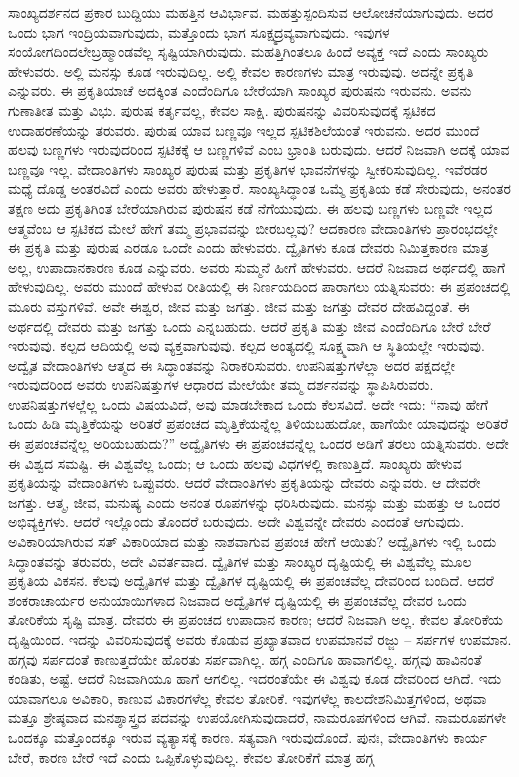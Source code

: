 ಸಾಂಖ್ಯದರ್ಶನದ ಪ್ರಕಾರ ಬುದ್ದಿಯು ಮಹತ್ತಿನ ಆವಿರ್ಭಾವ. ಮಹತ್ತು\break ಸ್ಪಂದಿಸುವ ಆಲೋಚನೆಯಾಗುವುದು. ಅದರ ಒಂದು ಭಾಗ ಇಂದ್ರಿಯವಾಗುವುದು, ಮತ್ತೊಂದು ಭಾಗ ಸೂಕ್ಷ್ಮದ್ರವ್ಯವಾಗುವುದು. ಇವುಗಳ ಸಂಯೋಗದಿಂದಲೇ\break ಬ್ರಹ್ಮಾಂಡವೆಲ್ಲ ಸೃಷ್ಟಿಯಾಗಿರುವುದು. ಮಹತ್ತಿಗಿಂತಲೂ ಹಿಂದೆ ಅವ್ಯಕ್ತ ಇದೆ ಎಂದು ಸಾಂಖ್ಯರು ಹೇಳುವರು. ಅಲ್ಲಿ ಮನಸ್ಸು ಕೂಡ ಇರುವುದಿಲ್ಲ. ಅಲ್ಲಿ ಕೇವಲ ಕಾರಣಗಳು ಮಾತ್ರ ಇರುವುವು. ಅದನ್ನೇ ಪ್ರಕೃತಿ ಎನ್ನುವರು. ಈ ಪ್ರಕೃತಿಯಾಚೆ ಅದಕ್ಕಿಂತ ಎಂದೆಂದಿಗೂ ಬೇರೆಯಾಗಿ ಸಾಂಖ್ಯರ ಪುರುಷನು ಇರುವನು. ಅವನು ಗುಣಾತೀತ ಮತ್ತು ವಿಭು. ಪುರುಷ ಕರ್ತೃವಲ್ಲ, ಕೇವಲ ಸಾಕ್ಷಿ. ಪುರುಷನನ್ನು ವಿವರಿಸುವುದಕ್ಕೆ ಸ್ಪಟಿಕದ ಉದಾಹರಣೆಯನ್ನು ತರುವರು. ಪುರುಷ ಯಾವ ಬಣ್ಣವೂ ಇಲ್ಲದ ಸ್ಪಟಿಕಶಿಲೆಯಂತೆ ಇರುವನು. ಅದರ ಮುಂದೆ ಹಲವು ಬಣ್ಣಗಳು ಇರುವುದರಿಂದ ಸ್ಪಟಿಕಕ್ಕೆ ಆ ಬಣ್ಣಗಳಿವೆ ಎಂಬ ಭ್ರಾಂತಿ ಬರುವುದು. ಆದರೆ ನಿಜವಾಗಿ ಅದಕ್ಕೆ ಯಾವ ಬಣ್ಣವೂ ಇಲ್ಲ. ವೇದಾಂತಿಗಳು ಸಾಂಖ್ಯರ ಪುರುಷ ಮತ್ತು ಪ್ರಕೃತಿಗಳ ಭಾವನೆಗಳನ್ನು ಸ್ವೀಕರಿಸುವುದಿಲ್ಲ. ಇವೆರಡರ ಮಧ್ಯೆ ದೊಡ್ಡ ಅಂತರವಿದೆ ಎಂದು ಅವರು ಹೇಳುತ್ತಾರೆ. ಸಾಂಖ್ಯಸಿದ್ಧಾಂತ ಒಮ್ಮೆ ಪ್ರಕೃತಿಯ ಕಡೆ ಸೇರುವುದು, ಅನಂತರ ತಕ್ಷಣ ಅದು ಪ್ರಕೃತಿಗಿಂತ ಬೇರೆಯಾಗಿರುವ ಪುರುಷನ ಕಡೆ ನೆಗೆಯುವುದು. ಈ ಹಲವು ಬಣ್ಣಗಳು ಬಣ್ಣವೇ ಇಲ್ಲದ ಆತ್ಮವೆಂಬ ಆ ಸ್ಪಟಿಕದ ಮೇಲೆ ಹೇಗೆ ತಮ್ಮ ಪ್ರಭಾವವನ್ನು ಬೀರಬಲ್ಲವು? ಆದಕಾರಣ ವೇದಾಂತಿಗಳು ಪ್ರಾರಂಭದಲ್ಲೇ ಈ ಪ್ರಕೃತಿ ಮತ್ತು ಪುರುಷ ಎರಡೂ ಒಂದೇ ಎಂದು ಹೇಳುವರು. ದ್ವೈತಿಗಳು ಕೂಡ ದೇವರು ನಿಮಿತ್ತಕಾರಣ ಮಾತ್ರ ಅಲ್ಲ, ಉಪಾದಾನಕಾರಣ ಕೂಡ ಎನ್ನುವರು. ಅವರು ಸುಮ್ಮನೆ ಹೀಗೆ ಹೇಳುವರು. ಆದರೆ ನಿಜವಾದ ಅರ್ಥದಲ್ಲಿ ಹಾಗೆ ಹೇಳುವುದಿಲ್ಲ. ಅವರು ಮುಂದೆ ಹೇಳುವ ರೀತಿಯಲ್ಲಿ ಈ ನಿರ್ಣಯದಿಂದ ಪಾರಾಗಲು ಯತ್ನಿಸುವರು: ಈ ಪ್ರಪಂಚದಲ್ಲಿ ಮೂರು ವಸ್ತುಗಳಿವೆ. ಅವೇ ಈಶ್ವರ, ಜೀವ ಮತ್ತು ಜಗತ್ತು. ಜೀವ ಮತ್ತು ಜಗತ್ತು ದೇವರ ದೇಹವಿದ್ದಂತೆ. ಈ ಅರ್ಥದಲ್ಲಿ ದೇವರು ಮತ್ತು ಜಗತ್ತು ಒಂದು ಎನ್ನಬಹುದು. ಆದರೆ ಪ್ರಕೃತಿ ಮತ್ತು ಜೀವ ಎಂದೆಂದಿಗೂ ಬೇರೆ ಬೇರೆ ಇರುವುವು. ಕಲ್ಪದ ಆದಿಯಲ್ಲಿ ಅವು ವ್ಯಕ್ತವಾಗುವುವು. ಕಲ್ಪದ ಅಂತ್ಯದಲ್ಲಿ ಸೂಕ್ಷ್ಮವಾಗಿ ಆ ಸ್ಥಿತಿಯಲ್ಲೇ ಇರುವುವು. ಅದ್ವೈತ ವೇದಾಂತಿಗಳು ಆತ್ಮದ ಈ ಸಿದ್ಧಾಂತವನ್ನು ನಿರಾಕರಿಸುವರು. ಉಪನಿಷತ್ತುಗಳೆಲ್ಲಾ ಅದರ ಪಕ್ಷದಲ್ಲೇ ಇರುವುದರಿಂದ ಅವರು ಉಪನಿಷತ್ತುಗಳ ಆಧಾರದ ಮೇಲೆಯೇ ತಮ್ಮ ದರ್ಶನವನ್ನು ಸ್ಥಾಪಿಸಿರುವರು. ಉಪನಿಷತ್ತುಗಳಲ್ಲೆಲ್ಲ ಒಂದು ವಿಷಯವಿದೆ, ಅವು ಮಾಡಬೇಕಾದ ಒಂದು ಕೆಲಸವಿದೆ. ಅದೇ ಇದು: “ನಾವು ಹೇಗೆ ಒಂದು ಹಿಡಿ ಮೃತ್ತಿಕೆಯನ್ನು ಅರಿತರೆ ಪ್ರಪಂಚದ ಮೃತ್ತಿಕೆಯನ್ನೆಲ್ಲ ತಿಳಿಯಬಹುದೋ, ಹಾಗೆಯೇ ಯಾವುದನ್ನು ಅರಿತರೆ ಈ ಪ್ರಪಂಚವನ್ನೆಲ್ಲ ಅರಿಯಬಹುದು?” ಅದ್ವೈತಿಗಳು ಈ ಪ್ರಪಂಚವನ್ನೆಲ್ಲ ಒಂದರ ಅಡಿಗೆ ತರಲು ಯತ್ನಿಸುವರು. ಅದೇ ಈ ವಿಶ್ವದ ಸಮಷ್ಟಿ. ಈ ವಿಶ್ವವೆಲ್ಲ ಒಂದು; ಆ ಒಂದು ಹಲವು ವಿಧಗಳಲ್ಲಿ ಕಾಣುತ್ತಿದೆ. ಸಾಂಖ್ಯರು ಹೇಳುವ ಪ್ರಕೃತಿಯನ್ನು ವೇದಾಂತಿಗಳು ಒಪ್ಪುವರು. ಆದರೆ ವೇದಾಂತಿಗಳು ಪ್ರಕೃತಿಯನ್ನು ದೇವರು ಎನ್ನುವರು. ಆ ದೇವರೇ ಜಗತ್ತು. ಆತ್ಮ, ಜೀವ, ಮನುಷ್ಯ ಎಂದು ಅನಂತ ರೂಪಗಳನ್ನು ಧರಿಸಿರುವುದು. ಮನಸ್ಸು ಮತ್ತು ಮಹತ್ತು ಆ ಒಂದರ ಅಭಿವ್ಯಕ್ತಿಗಳು. ಆದರೆ ಇಲ್ಲೊಂದು ತೊಂದರೆ ಬರುವುದು. ಅದೇ ವಿಶ್ವವನ್ನೇ ದೇವರು ಎಂದಂತೆ ಆಗುವುದು. ಅವಿಕಾರಿಯಾಗಿರುವ ಸತ್ ವಿಕಾರಿಯಾದ ಮತ್ತು ನಾಶವಾಗುವ ಪ್ರಪಂಚ ಹೇಗೆ ಆಯಿತು? ಅದ್ವೈತಿಗಳು ಇಲ್ಲಿ ಒಂದು ಸಿದ್ಧಾಂತವನ್ನು ತರುವರು, ಅದೇ ವಿವರ್ತವಾದ. ದ್ವೈತಿಗಳ ಮತ್ತು ಸಾಂಖ್ಯರ ದೃಷ್ಟಿಯಲ್ಲಿ ಈ ವಿಶ್ವವೆಲ್ಲ ಮೂಲ ಪ್ರಕೃತಿಯ ವಿಕಸನ. ಕೆಲವು ಅದ್ವೈತಿಗಳ ಮತ್ತು ದ್ವೈತಿಗಳ ದೃಷ್ಟಿಯಲ್ಲಿ ಈ ಪ್ರಪಂಚವೆಲ್ಲ ದೇವರಿಂದ ಬಂದಿದೆ. ಆದರೆ ಶಂಕರಾಚಾರ್ಯರ ಅನುಯಾಯಿಗಳಾದ ನಿಜವಾದ ಅದ್ವೈತಿಗಳ ದೃಷ್ಟಿಯಲ್ಲಿ ಈ ಪ್ರಪಂಚವೆಲ್ಲ ದೇವರ ಒಂದು ತೋರಿಕೆಯ ಸೃಷ್ಟಿ ಮಾತ್ರ. ದೇವರು ಈ ಪ್ರಪಂಚದ ಉಪಾದಾನ ಕಾರಣ; ಆದರೆ ನಿಜವಾಗಿ ಅಲ್ಲ. ಕೇವಲ ತೋರಿಕೆಯ ದೃಷ್ಟಿಯಿಂದ. ಇದನ್ನು ವಿವರಿಸುವುದಕ್ಕೆ ಅವರು ಕೊಡುವ ಪ್ರಖ್ಯಾತವಾದ ಉಪಮಾನವೆ ರಜ್ಜು – ಸರ್ಪಗಳ ಉಪಮಾನ. ಹಗ್ಗವು ಸರ್ಪದಂತೆ ಕಾಣುತ್ತದೆಯೇ ಹೊರತು ಸರ್ಪವಾಗಿಲ್ಲ. ಹಗ್ಗ ಎಂದಿಗೂ ಹಾವಾಗಲಿಲ್ಲ. ಹಗ್ಗವು ಹಾವಿನಂತೆ ಕಂಡಿತು, ಅಷ್ಟೆ. ಆದರೆ ನಿಜವಾಗಿಯೂ ಹಾಗೆ ಆಗಲಿಲ್ಲ. ಇದರಂತೆಯೇ ಈ ವಿಶ್ವವು ಕೂಡ ದೇವರಿಂದ ಆಗಿದೆ. ಇದು ಯಾವಾಗಲೂ ಅವಿಕಾರಿ, ಕಾಣುವ ವಿಕಾರಗಳೆಲ್ಲ ಕೇವಲ ತೋರಿಕೆ. ಇವುಗಳೆಲ್ಲ ಕಾಲದೇಶನಿಮಿತ್ತಗಳಿಂದ, ಅಥವಾ ಮತ್ತೂ ಶ್ರೇಷ್ಠವಾದ ಮನಶ್ಶಾಸ್ತ್ರದ ಪದವನ್ನು ಉಪಯೋಗಿಸುವುದಾದರೆ, ನಾಮರೂಪಗಳಿಂದ ಆಗಿವೆ. ನಾಮರೂಪಗಳೇ ಒಂದಕ್ಕೂ ಮತ್ತೊಂದಕ್ಕೂ ಇರುವ ವ್ಯತ್ಯಾಸಕ್ಕೆ ಕಾರಣ. ಸತ್ಯವಾಗಿ ಇರುವುದೊಂದೆ. ಪುನಃ, ವೇದಾಂತಿಗಳು ಕಾರ್ಯ ಬೇರೆ, ಕಾರಣ ಬೇರೆ ಇದೆ ಎಂದು ಒಪ್ಪಿಕೊಳ್ಳುವುದಿಲ್ಲ. ಕೇವಲ ತೋರಿಕೆಗೆ ಮಾತ್ರ ಹಗ್ಗ 